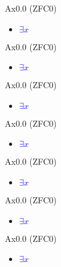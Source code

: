 \documentclass{article}
\begin{document}
{\Large Ax0.0 (ZFC0)}\par
\begin{itemize}
    \item[]
    {\large \textcolor{blue}{$\exists x$}}\par
    {\textcolor{pf}{}}
\end{itemize}\par
\quad

{\Large Ax0.0 (ZFC0)}\par
\begin{itemize}
    \item[]
    {\large \textcolor{blue}{$\exists x$}}\par
    {\textcolor{pf}{}}
\end{itemize}\par
\quad

{\Large Ax0.0 (ZFC0)}\par
\begin{itemize}
    \item[]
    {\large \textcolor{blue}{$\exists x$}}\par
    {\textcolor{pf}{}}
\end{itemize}\par
\quad

{\Large Ax0.0 (ZFC0)}\par
\begin{itemize}
    \item[]
    {\large \textcolor{blue}{$\exists x$}}\par
    {\textcolor{pf}{}}
\end{itemize}\par
\quad

{\Large Ax0.0 (ZFC0)}\par
\begin{itemize}
    \item[]
    {\large \textcolor{blue}{$\exists x$}}\par
    {\textcolor{pf}{}}
\end{itemize}\par
\quad

{\Large Ax0.0 (ZFC0)}\par
\begin{itemize}
    \item[]
    {\large \textcolor{blue}{$\exists x$}}\par
    {\textcolor{pf}{}}
\end{itemize}\par
\quad

{\Large Ax0.0 (ZFC0)}\par
\begin{itemize}
    \item[]
    {\large \textcolor{blue}{$\exists x$}}\par
    {\textcolor{pf}{}}
\end{itemize}\par
\quad
\end{document}
